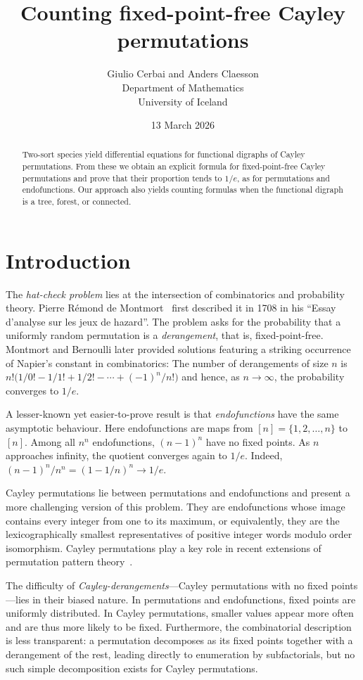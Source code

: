 \documentclass[a4paper,11pt,UKenglish]{article}
\title{Counting fixed-point-free Cayley permutations}
\date{13 March 2026}
\author{Giulio Cerbai \;and\; Anders Claesson \vspace{1.5ex}\\
Department of Mathematics\vspace{0.15ex}\\ University of Iceland}
\theoremstyle{definition}
\begin{document}
\maketitle
\thispagestyle{empty}

\begin{abstract}
Two-sort species yield differential equations for functional digraphs
of Cayley permutations.
From these we obtain an explicit formula for fixed-point-free Cayley
permutations and prove that their proportion tends to $1/e$, as
for permutations and endofunctions. Our approach also yields counting
formulas when the functional digraph is a tree, forest, or connected.
\end{abstract}

\section{Introduction}

The \emph{hat-check problem} lies at the intersection of combinatorics
and probability theory. Pierre Rémond de Montmort~\cite{Mon} first
described it in 1708 in his ``Essay d'analyse sur les jeux de hazard''.
The problem asks for the probability that a uniformly random permutation
is a \emph{derangement}, that is, fixed-point-free. Montmort and Bernoulli
later provided solutions featuring a striking occurrence of Napier's
constant in combinatorics: The number of derangements of size $n$ is
$n!\bigl(1/0! - 1/1! + 1/2! - \cdots + (-1)^n/n!\bigr)$
and hence, as $n\to\infty$, the probability converges to $1/e$.

A lesser-known yet easier-to-prove result is that \emph{endofunctions}
have the same asymptotic behaviour. Here endofunctions are maps from
$[n]=\{1,2,\ldots,n\}$ to $[n]$. Among all $n^n$ endofunctions,
$(n-1)^n$ have no fixed points. As $n$ approaches infinity, the quotient
converges again to $1/e$. Indeed, $(n-1)^n/n^n = (1-1/n)^{n}\to 1/e$.

Cayley permutations lie between permutations and endofunctions and
present a more challenging version of this problem. They are
endofunctions whose image contains every integer from one to its
maximum, or equivalently, they are the lexicographically smallest
representatives of positive integer words modulo order isomorphism.
Cayley permutations play a key role in recent extensions of
permutation pattern theory~\cite{BBO,CeCay,CCtop,CCcaypol,CCcaypol2}.

The difficulty of \emph{Cayley-derangements}---Cayley permutations
with no fixed points---lies in their biased nature. In permutations
and endofunctions, fixed points are uniformly distributed. In Cayley
permutations, smaller values appear more often and are thus more
likely to be fixed. Furthermore, the combinatorial description is
less transparent: a permutation decomposes as its fixed points
together with a derangement of the rest, leading directly to
enumeration by subfactorials, but no such simple decomposition
exists for Cayley permutations.
\end{document}
